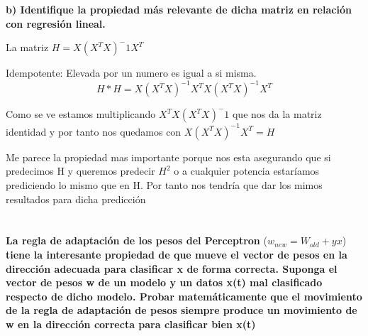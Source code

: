 \documentclass[titlepage]{article}
\begin{document}
  	\textbf{b) Identifique la propiedad más relevante de dicha matriz en relación con regresión lineal.}
  	
  	La matriz $H=X(X^TX)^-1X^T$ 

  	 	\begin{comment}
  	 	\item Cuadrada: Es una matriz cuadrada nxn donde n es el numero de individuos de nuestro conjunto de datos. 
  	 	\item Simétrica: La traspuesta de H es igual a H. 
  	 	$$
  	 	H = [X(X^TX)^{-1}X^T]^T = X[(X^TX)^{-1}]^TX^T
  	 	=X[(X^TX)^T]^{-1}X^T
  	 	=X[X^TX]^{-1}X^T = H
  	 	$$
  	 	
  	 	\end{comment}
  	 	Idempotente: Elevada por un numero es igual a si misma.
  	 	$$
  	 	H*H = X(X^TX)^{-1}X^TX(X^TX)^{-1}X^T $$
  	 	
  	 	Como se ve estamos multiplicando  $X^TX(X^TX)^-1$  que nos da la matriz identidad y por tanto nos quedamos con 
  	 	$ X(X^TX)^{-1}X^T=H
  	 	$
  	 	\newline
  	 	
  	 	Me parece la propiedad mas importante porque nos esta asegurando que si predecimos H y queremos predecir $H^2$ o a cualquier potencia estaríamos prediciendo lo mismo que en H. Por tanto nos tendría que dar los mimos resultados para dicha predicción
  	 	
  	 	\begin{comment}
  	 	
  	 	\item Semidefinida positiva: Lo que significa que para cualquier vector u el resultado de hacer $u^THu$ es mayor o igual que 0. Al ser idempotente podemos hacer 
  	 	$u^THu = u^THHu$  al ser simétrica podemos escribir que 
  	 	$$
  	 	u^THHu = u^TH^THu = (Hu)^T(Hu) = ||Hu||^2
  	 	$$
  	 	
  	 	y $||Hu||^2$ es siempre mayor o igual a 0.
  	 	
  	 	\item Si la matriz $X_{nxk}$ tiene un rag(X) = k entonces el ran(H) = r
  	 	\end{comment}

  	 
  	 \section{}
  	 \textbf{La regla de adaptación de los pesos del Perceptron }($w_{new}=W_{old}+yx$) \textbf{tiene la interesante propiedad de que mueve el vector de pesos en la dirección adecuada para clasificar x de forma correcta. Suponga el vector de pesos w de un modelo y un datos x(t) mal clasificado respecto de dicho modelo. Probar matemáticamente que el movimiento  de la regla de adaptación de pesos siempre produce un movimiento de w en la dirección correcta para clasificar bien x(t)}  	 
  	 
\end{document}
